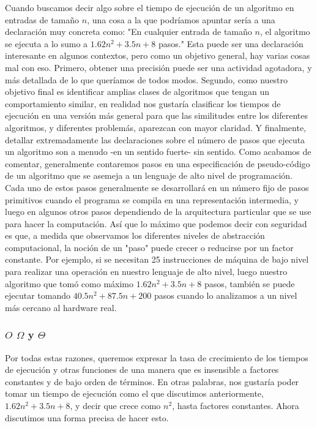 \documentclass[a4paper]{article}
\begin{document}
Cuando buscamos decir algo sobre el tiempo de ejecución de un algoritmo en entradas de tamaño $n$, una cosa a la que podríamos apuntar sería a una declaración muy concreta como: "En cualquier entrada de tamaño $n$, el algoritmo se ejecuta a lo sumo a $1.62n^2 + 3.5n + 8$ pasos." Esta puede ser una declaración interesante en algunos contextos, pero como un objetivo general, hay varias cosas mal con eso. Primero, obtener una precisión puede ser una actividad agotadora, y más detallada de lo que queríamos de todos modos. Segundo, como nuestro objetivo final es identificar amplias clases de algoritmos que tengan un comportamiento similar, en realidad nos gustaría clasificar los tiempos de ejecución en una versión más general para que las similitudes entre los diferentes algoritmos, y diferentes problemás, aparezcan con mayor claridad. Y finalmente, detallar extremadamente las declaraciones sobre el número de pasos que ejecuta un algoritmo son a menudo -en un sentido fuerte- sin sentido. Como acabamos de comentar, generalmente contaremos pasos en una especificación de pseudo-código de un algoritmo que se asemeja a un lenguaje de alto nivel de programación. Cada uno de estos pasos generalmente se desarrollará en un número fijo de pasos primitivos cuando el programa se compila en una representación intermedia, y luego en algunos otros pasos dependiendo de la arquitectura particular que se use para hacer la computación. Así que lo máximo que podemos decir con seguridad es que, a medida que observamos los diferentes niveles de abstracción computacional, la noción de un "paso" puede crecer o reducirse por un factor constante. Por ejemplo, si se necesitan 25 instrucciones de máquina de bajo nivel para realizar una operación en nuestro lenguaje de alto nivel, luego nuestro algoritmo que tomó como máximo $1.62n^2 + 3.5n + 8$ pasos, también se puede ejecutar tomando $40.5n^2 + 87.5n + 200$ pasos cuando lo analizamos a un nivel más cercano al hardware real.\\

\subsubsection*{$O$ $\Omega $ y $\Theta$}

Por todas estas razones, queremos expresar la tasa de crecimiento de los tiempos de ejecución y otras funciones de una manera que es insensible a factores constantes y de bajo orden de términos. En otras palabras, nos gustaría poder tomar un tiempo de ejecución como el que discutimos anteriormente, $1.62n^2 + 3.5n + 8$, y decir que crece como $n^2$, hasta factores constantes. Ahora discutimos una forma precisa de hacer esto.\\
\end{document}

